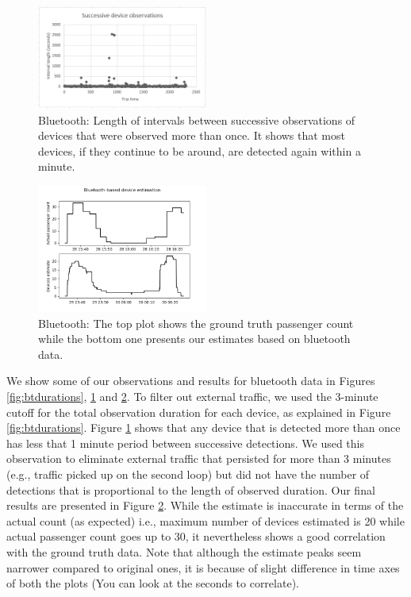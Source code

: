 \begin{figure}[!t]
\centering
\includegraphics[width=0.5\textwidth]{ble_interval_lengths.png}
\caption{Bluetooth: Length of intervals between successive observations of devices that were observed more than once. It shows that most devices, if they continue to be around, are detected again within a minute.}
\label{fig:btintervals}
\end{figure}

\begin{figure}[!t]
\centering
\includegraphics[width=0.5\textwidth]{ble_devices_estimate.png}
\caption{Bluetooth: The top plot shows the ground truth passenger count while the bottom one presents our estimates based on bluetooth data.}
\label{fig:btestimate}
\end{figure}

We show some of our observations and results for bluetooth data in Figures \ref{fig:btdurations}, \ref{fig:btintervals} and \ref{fig:btestimate}. To filter out external traffic, we used the 3-minute cutoff for the total observation duration for each device, as explained in Figure \ref{fig:btdurations}. Figure \ref{fig:btintervals} shows that any device that is detected more than once has less that 1 minute period between successive detections. We used this observation to eliminate external traffic that persisted for more than 3 minutes (e.g., traffic picked up on the second loop) but did not have the number of detections that is proportional to the length of observed duration. Our final results are presented in Figure \ref{fig:btestimate}. While the estimate is inaccurate in terms of the actual count (as expected) i.e., maximum number of devices estimated is 20 while actual passenger count goes up to 30, it nevertheless shows a good correlation with the ground truth data. Note that although the estimate peaks seem narrower compared to original ones, it is because of slight difference in time axes of both the plots (You can look at the seconds to correlate).


